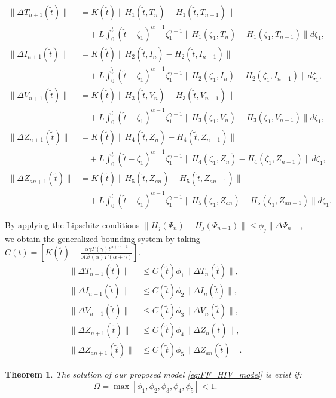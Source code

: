 \documentclass[10pt,a4paper]{amsart}
\newtheorem{theorem}{Theorem}[section]
\numberwithin{equation}{section}
\begin{document}
\begin{align*}
	\|\Delta T_{n+1}(\tilde{t})\| &= K(\tilde{t}) \|H_1(\tilde{t}, T_n) - H_1(\tilde{t}, T_{n-1})\| \\
	&\quad + L \int_0^{\tilde{t}} (\tilde{t}-\zeta_1)^{\alpha-1} \zeta_1^{\gamma-1} \|H_1(\zeta_1, T_n) - H_1(\zeta_1, T_{n-1})\| d\zeta_1, \\[10pt]
	\|\Delta I_{n+1}(\tilde{t})\| &= K(\tilde{t}) \|H_2(\tilde{t}, I_n) - H_2(\tilde{t}, I_{n-1})\| \\
	&\quad + L \int_0^{\tilde{t}} (\tilde{t}-\zeta_1)^{\alpha-1} \zeta_1^{\gamma-1} \|H_2(\zeta_1, I_n) - H_2(\zeta_1, I_{n-1})\| d\zeta_1, \\[10pt]
	\|\Delta V_{n+1}(\tilde{t})\| &= K(\tilde{t}) \|H_3(\tilde{t}, V_n) - H_3(\tilde{t}, V_{n-1})\| \\
	&\quad + L \int_0^{\tilde{t}} (\tilde{t}-\zeta_1)^{\alpha-1} \zeta_1^{\gamma-1} \|H_3(\zeta_1, V_n) - H_3(\zeta_1, V_{n-1})\| d\zeta_1, \\[10pt]
	\|\Delta Z_{n+1}(\tilde{t})\| &= K(\tilde{t}) \|H_4(\tilde{t}, Z_n) - H_4(\tilde{t}, Z_{n-1})\| \\
	&\quad + L \int_0^{\tilde{t}} (\tilde{t}-\zeta_1)^{\alpha-1} \zeta_1^{\gamma-1} \|H_4(\zeta_1, Z_n) - H_4(\zeta_1, Z_{n-1})\| d\zeta_1, \\[10pt]
	\|\Delta Z_{an+1}(\tilde{t})\| &= K(\tilde{t}) \|H_5(\tilde{t}, Z_{an}) - H_5(\tilde{t}, Z_{an-1})\| \\
	&\quad + L \int_0^{\tilde{t}} (\tilde{t}-\zeta_1)^{\alpha-1} \zeta_1^{\gamma-1} \|H_5(\zeta_1, Z_{an}) - H_5(\zeta_1, Z_{an-1})\| d\zeta_1.
\end{align*}

By applying the Lipschitz conditions $\|H_j(\Psi_n) - H_j(\Psi_{n-1})\| \leq \phi_j \|\Delta \Psi_n\|$, we obtain the generalized bounding system by taking $C(t) =\left[ K(\tilde{t}) + \frac{\alpha\gamma \Gamma(\gamma) t^{\alpha+\gamma-1}}{\mathcal{AB(\alpha)}\Gamma(\alpha+\gamma)} \right] $.
\begin{align*}
	\|\Delta T_{n+1}(\tilde{t})\| &\leq C(\tilde{t}) \phi_1 \|\Delta T_n(\tilde{t})\|, \\[10pt]
	\|\Delta I_{n+1}(\tilde{t})\| &\leq C(\tilde{t}) \phi_2 \|\Delta I_n(\tilde{t})\|, \\[10pt]
	\|\Delta V_{n+1}(\tilde{t})\| &\leq C(\tilde{t}) \phi_3 \|\Delta V_n(\tilde{t})\|, \\[10pt]
	\|\Delta Z_{n+1}(\tilde{t})\| &\leq C(\tilde{t}) \phi_4 \|\Delta Z_n(\tilde{t})\|, \\[10pt]
	\|\Delta Z_{an+1}(\tilde{t})\| &\leq C(\tilde{t}) \phi_5 \|\Delta Z_{an}(\tilde{t})\|.
\end{align*}
\begin{theorem}
	The solution of our proposed model \eqref{eq:FF_HIV_model} is exist if:
	\begin{equation}
		\Omega = \max[\phi_1, \phi_2, \phi_3, \phi_4, \phi_5] < 1.
	\end{equation}
\end{theorem}
\end{document}
